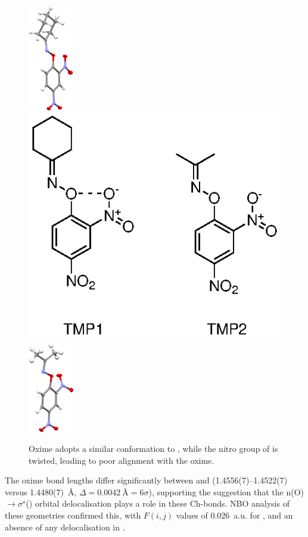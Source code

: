\begin{refsection}
\begin{figure}
	\centering
	\includegraphics[width=2cm]{Figures/cyclohexanone-oxime-dnp-xray.png}
	\includegraphics[scale=0.8]{Figures/oximes.eps}
	\includegraphics[width=2cm]{Figures/acetone-oxime-dnp-xray.png}
	\caption{Oxime  adopts a similar conformation to , while the nitro group of  is twisted, leading to poor alignment with the oxime.}
	\label{fig:analogues}
\end{figure}

The oxime bond lengths differ significantly between  and  (1.4556(7)--1.4522(7) versus 1.4480(7)~\AA, $\Delta = 0.0042~\text{\AA} = 6\sigma$), supporting the suggestion that the n(O)$\rightarrow \sigma^{\star}$() orbital delocalisation plays a role in these Ch-bonds.
NBO analysis of these geometries confirmed this, with $F(i,j)$ values of 0.026~a.u. for , and an absence of any delocalisation in .


\end{refsection}
